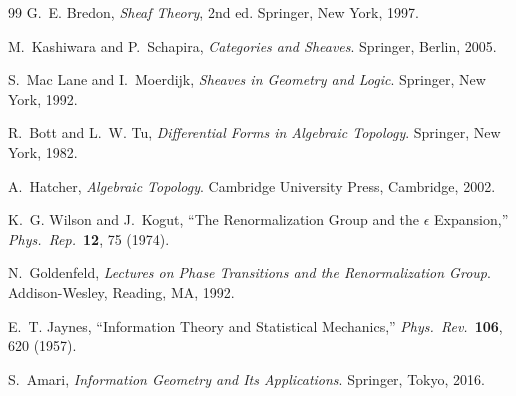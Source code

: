 \documentclass[11pt, a4paper]{article}
\theoremstyle{plain}
\theoremstyle{definition}
\theoremstyle{remark}
\begin{document}
\begin{thebibliography}{99}
G.~E. Bredon,
\textit{Sheaf Theory}, 2nd ed.
Springer, New York, 1997.

M.~Kashiwara and P.~Schapira,
\textit{Categories and Sheaves}.
Springer, Berlin, 2005.

S.~Mac Lane and I.~Moerdijk,
\textit{Sheaves in Geometry and Logic}.
Springer, New York, 1992.

R.~Bott and L.~W. Tu,
\textit{Differential Forms in Algebraic Topology}.
Springer, New York, 1982.

A.~Hatcher,
\textit{Algebraic Topology}.
Cambridge University Press, Cambridge, 2002.

K.~G. Wilson and J.~Kogut,
``The Renormalization Group and the $\epsilon$ Expansion,''
\textit{Phys.\ Rep.}\ \textbf{12}, 75 (1974).

N.~Goldenfeld,
\textit{Lectures on Phase Transitions and the Renormalization Group}.
Addison-Wesley, Reading, MA, 1992.

E.~T. Jaynes,
``Information Theory and Statistical Mechanics,''
\textit{Phys.\ Rev.}\ \textbf{106}, 620 (1957).

S.~Amari,
\textit{Information Geometry and Its Applications}.
Springer, Tokyo, 2016.

\end{thebibliography}
\end{document}
